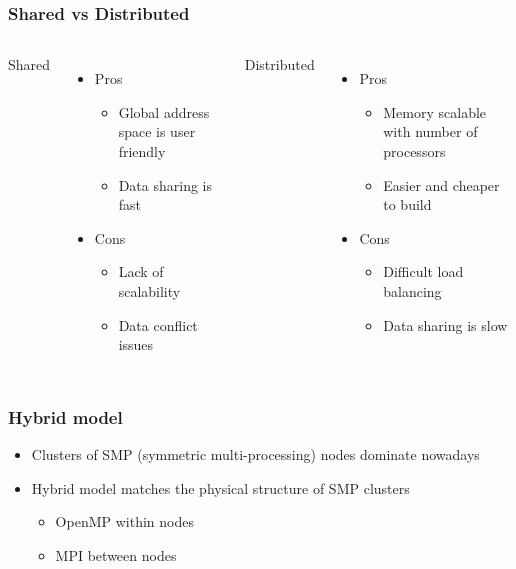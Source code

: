 \documentclass[10pt,t]{beamer}
\begin{document}
\begin{frame}
  \frametitle{Shared vs Distributed}
  \begin{columns}
    \column{5cm}
    \begin{description}
    \item {Shared}
    \end{description}
    \begin{itemize}
    \item Pros
      \begin{itemize}
      \item Global address space is user friendly
      \item Data sharing is fast
      \end{itemize}
    \item Cons
      \begin{itemize}
      \item Lack of scalability
      \item Data conflict issues
      \end{itemize}
    \end{itemize}
    \column{5cm}
    \begin{description}
    \item {Distributed}
    \end{description}
    \begin{itemize}
    \item Pros
      \begin{itemize}
      \item Memory scalable with number of processors
      \item Easier and cheaper to build
      \end{itemize}
    \item Cons
      \begin{itemize}
      \item Difficult load balancing
      \item Data sharing is slow
      \end{itemize}
    \end{itemize}
  \end{columns}
\end{frame}

\begin{frame}
  \frametitle{Hybrid model}
  \begin{itemize}
  \item Clusters of SMP (symmetric multi-processing) nodes dominate nowadays
  \item Hybrid model matches the physical structure of SMP clusters
    \begin{itemize}
    \item OpenMP within nodes
    \item MPI between nodes
    \end{itemize}
    
  \end{itemize}
\end{frame}
\end{document}
